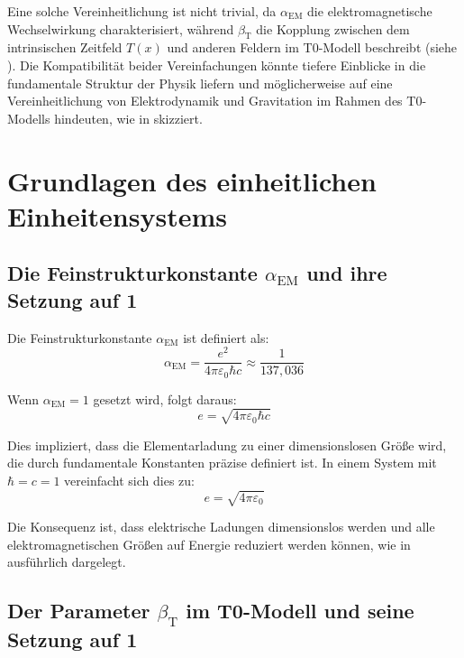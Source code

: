 \documentclass[12pt,a4paper]{article}
\newcommand{\Tfield}{T(x)}
\newcommand{\alphaEM}{\alpha_{\text{EM}}}
\newcommand{\betaT}{\beta_{\text{T}}}
\begin{document}
	Eine solche Vereinheitlichung ist nicht trivial, da \(\alphaEM\) die elektromagnetische Wechselwirkung charakterisiert, während \(\betaT\) die Kopplung zwischen dem intrinsischen Zeitfeld \(\Tfield\) und anderen Feldern im T0-Modell beschreibt (siehe \cite{pascher_zeit_2025, pascher_higgs_2025}). Die Kompatibilität beider Vereinfachungen könnte tiefere Einblicke in die fundamentale Struktur der Physik liefern und möglicherweise auf eine Vereinheitlichung von Elektrodynamik und Gravitation im Rahmen des T0-Modells hindeuten, wie in \cite{pascher_emergente_gravitation_2025} skizziert.
	
	\section{Grundlagen des einheitlichen Einheitensystems}
	\label{sec:foundations}
	
	\subsection{Die Feinstrukturkonstante \(\alphaEM\) und ihre Setzung auf 1}
	\label{subsec:alpha_one}
	
	Die Feinstrukturkonstante \(\alphaEM\) ist definiert als:
	\begin{equation}
		\alphaEM = \frac{e^2}{4\pi\varepsilon_0 \hbar c} \approx \frac{1}{137,036}
	\end{equation}
	
	Wenn \(\alphaEM = 1\) gesetzt wird, folgt daraus:
	\begin{equation}
		e = \sqrt{4\pi\varepsilon_0 \hbar c}
	\end{equation}
	
	Dies impliziert, dass die Elementarladung zu einer dimensionslosen Größe wird, die durch fundamentale Konstanten präzise definiert ist. In einem System mit \(\hbar = c = 1\) vereinfacht sich dies zu:
	\begin{equation}
		e = \sqrt{4\pi\varepsilon_0}
	\end{equation}
	
	Die Konsequenz ist, dass elektrische Ladungen dimensionslos werden und alle elektromagnetischen Größen auf Energie reduziert werden können, wie in \cite{pascher_alpha_2025} ausführlich dargelegt.
	
	\subsection{Der Parameter \(\betaT\) im T0-Modell und seine Setzung auf 1}
	\label{subsec:beta_one}
	
\end{document}
